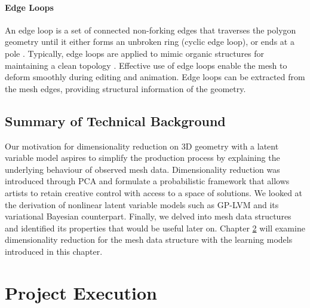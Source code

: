 \documentclass[ %
author={Dillon Keith Diep},
supervisor={Dr. Carl Henrik Ek},
degree={MEng},
title={ART-CG Hair:},
subtitle={Assisted Real-time Content Generation of Stylised Virtual Hair},
type={Research},
year={2017} ]{dissertation}
\begin{document}
	\subsubsection{Edge Loops}
	An edge loop is a set of connected non-forking edges that traverses the polygon geometry until it either forms an unbroken ring (cyclic edge loop), or ends at a pole \cite[p.93]{blenderstudio}. Typically, edge loops are applied to mimic organic structures for maintaining a clean topology \cite[pp.10-12]{edgeloops}. Effective use of edge loops enable the mesh to deform smoothly during editing and animation. Edge loops can be extracted from the mesh edges, providing structural information of the geometry.
	
	\section{Summary of Technical Background}
	Our motivation for dimensionality reduction on 3D geometry with a latent variable model aspires to simplify the production process by explaining the underlying behaviour of observed mesh data.
	Dimensionality reduction was introduced through PCA and formulate a probabilistic framework that allows artists to retain creative control with access to a space of solutions.
	We looked at the derivation of nonlinear latent variable models such as GP-LVM and its variational Bayesian counterpart.
	Finally, we delved into mesh data structures and identified its properties that would be useful later on.
	Chapter \ref{chap:execution} will examine dimensionality reduction for the mesh data structure with the learning models introduced in this chapter.
	
	
	\chapter{Project Execution}
	\label{chap:execution}
	
\end{document}

